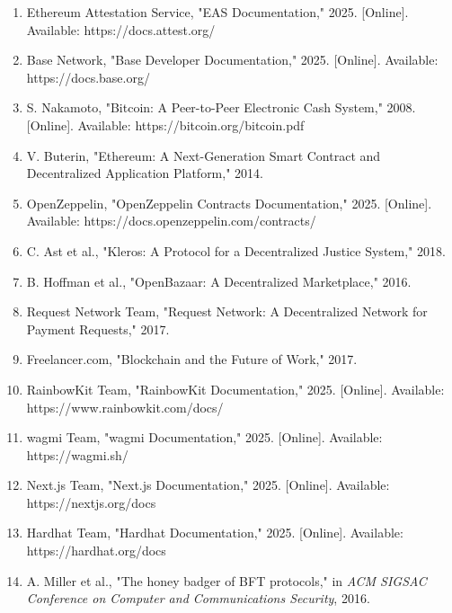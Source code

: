 \documentclass[12pt,a4paper]{article}
\begin{document}
\begin{enumerate}
    \item Ethereum Attestation Service, "EAS Documentation," 2025. [Online]. Available: https://docs.attest.org/
    
    \item Base Network, "Base Developer Documentation," 2025. [Online]. Available: https://docs.base.org/
    
    \item S. Nakamoto, "Bitcoin: A Peer-to-Peer Electronic Cash System," 2008. [Online]. Available: https://bitcoin.org/bitcoin.pdf
    
    \item V. Buterin, "Ethereum: A Next-Generation Smart Contract and Decentralized Application Platform," 2014.
    
    \item OpenZeppelin, "OpenZeppelin Contracts Documentation," 2025. [Online]. Available: https://docs.openzeppelin.com/contracts/
    
    \item C. Ast et al., "Kleros: A Protocol for a Decentralized Justice System," 2018.
    
    \item B. Hoffman et al., "OpenBazaar: A Decentralized Marketplace," 2016.
    
    \item Request Network Team, "Request Network: A Decentralized Network for Payment Requests," 2017.
    
    \item Freelancer.com, "Blockchain and the Future of Work," 2017.
    
    \item RainbowKit Team, "RainbowKit Documentation," 2025. [Online]. Available: https://www.rainbowkit.com/docs/
    
    \item wagmi Team, "wagmi Documentation," 2025. [Online]. Available: https://wagmi.sh/
    
    \item Next.js Team, "Next.js Documentation," 2025. [Online]. Available: https://nextjs.org/docs
    
    \item Hardhat Team, "Hardhat Documentation," 2025. [Online]. Available: https://hardhat.org/docs
    
    \item A. Miller et al., "The honey badger of BFT protocols," in \textit{ACM SIGSAC Conference on Computer and Communications Security}, 2016.
    

\end{enumerate}
\end{document}
